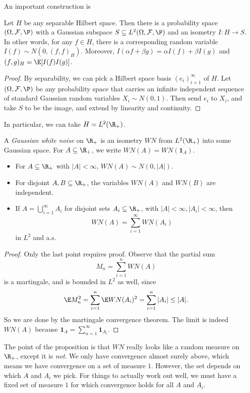 \documentclass[a4paper]{article}
\begin{document}
An important construction is
\begin{prop}
  Let $H$ be any separable Hilbert space. Then there is a probability space $(\Omega, \mathcal{F}, \P)$ with a Gaussian subspace $S \subseteq L^2(\Omega, \mathcal{F}, \P)$ and an isometry $I: H \to S$. In other words, for any $f \in H$, there is a corresponding random variable $I(f) \sim N(0, (f, f)_H)$. Moreover, $I(\alpha f + \beta g) = \alpha I(f) + \beta I(g)$ and $(f, g)_H = \E[I(f) I(g)]$.
\end{prop}

\begin{proof}
  By separability, we can pick a Hilbert space basis $(e_i)_{i = 1}^\infty$ of $H$. Let $(\Omega, \mathcal{F}, \P)$ be any probability space that carries an infinite independent sequence of standard Gaussian random variables $X_i \sim N(0, 1)$. Then send $e_i$ to $X_i$, and take $S$ to be the image, and extend by linearity and continuity.
\end{proof}

In particular, we can take $H = L^2(\R_+)$.

\begin{defi}
  A \emph{Gaussian white noise} on $\R_+$ is an isometry $WN$ from $L^2(\R_+)$ into some Gaussian space. For $A \subseteq \R_+$, we write $WN(A) = WN(\mathbf{1}_A)$.
\end{defi}

\begin{prop}\leavevmode
  \begin{itemize}
    \item For $A \subseteq \R_+$ with $|A| < \infty$, $WN(A) \sim N(0, |A|)$.
    \item For disjoint $A, B \subseteq \R_+$, the variables $WN(A)$ and $WN(B)$ are independent.
    \item If $A = \bigcup_{i = 1}^\infty A_i$ for disjoint sets $A_i \subseteq \R_+$, with $|A| < \infty, |A_i| < \infty$, then
      \[
        WN(A) = \sum_{i = 1}^\infty WN(A_i)
      \]
      in $L^2$ and a.s.
  \end{itemize}
\end{prop}

\begin{proof}
  Only the last point requires proof. Observe that the partial sum
  \[
    M_n = \sum_{i = 1}^n WN(A)
  \]
  is a martingale, and is bounded in $L^2$ as well, since
  \[
    \E M_n^2 = \sum_{i = 1}^n \E WN(A_i)^2 = \sum_{i = 1}^n |A_i| \leq |A|.
  \]
  So we are done by the martingale convergence theorem. The limit is indeed $WN(A)$ because $\mathbf{1}_A = \sum_{n = 1}^\infty \mathbf{1}_{A_i}$.
\end{proof}
The point of the proposition is that $WN$ really looks like a random measure on $\R_+$, except it is \emph{not}. We only have convergence almost surely above, which means we have convergence on a set of measure $1$. However, the set depends on which $A$ and $A_i$ we pick. For things to actually work out well, we must have a fixed set of measure $1$ for which convergence holds for all $A$ and $A_i$.
\end{document}
